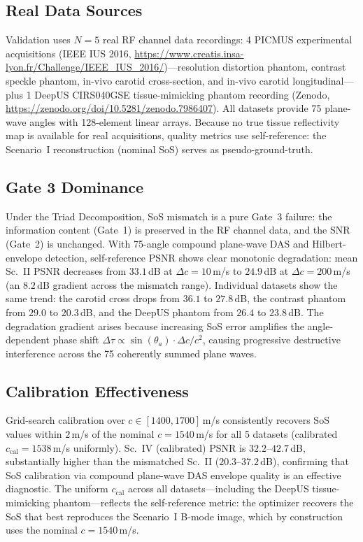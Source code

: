 \documentclass[11pt]{article}
\theoremstyle{definition}
\begin{document}
\subsection{Real Data Sources}
Validation uses $N{=}5$ real RF channel data recordings: 4 PICMUS experimental acquisitions (IEEE IUS 2016, \url{https://www.creatis.insa-lyon.fr/Challenge/IEEE_IUS_2016/})---resolution distortion phantom, contrast speckle phantom, in-vivo carotid cross-section, and in-vivo carotid longitudinal---plus 1 DeepUS CIRS040GSE tissue-mimicking phantom recording (Zenodo, \url{https://zenodo.org/doi/10.5281/zenodo.7986407}). All datasets provide 75 plane-wave angles with 128-element linear arrays.
Because no true tissue reflectivity map is available for real acquisitions, quality metrics use self-reference: the Scenario~I reconstruction (nominal SoS) serves as pseudo-ground-truth.

\subsection{Gate 3 Dominance}
Under the Triad Decomposition, SoS mismatch is a pure Gate~3 failure: the information content (Gate~1) is preserved in the RF channel data, and the SNR (Gate~2) is unchanged. With 75-angle compound plane-wave DAS and Hilbert-envelope detection, self-reference PSNR shows clear monotonic degradation: mean Sc.~II PSNR decreases from $33.1$\,dB at $\Delta c{=}10$\,m/s to $24.9$\,dB at $\Delta c{=}200$\,m/s (an $8.2$\,dB gradient across the mismatch range). Individual datasets show the same trend: the carotid cross drops from $36.1$ to $27.8$\,dB, the contrast phantom from $29.0$ to $20.3$\,dB, and the DeepUS phantom from $26.4$ to $23.8$\,dB. The degradation gradient arises because increasing SoS error amplifies the angle-dependent phase shift $\Delta\tau \propto \sin(\theta_a)\cdot\Delta c / c^2$, causing progressive destructive interference across the 75 coherently summed plane waves.

\subsection{Calibration Effectiveness}
Grid-search calibration over $c \in [1400, 1700]$\,m/s consistently recovers SoS values within $2$\,m/s of the nominal $c{=}1540$\,m/s for all 5 datasets (calibrated $c_{\mathrm{cal}} = 1538$\,m/s uniformly). Sc.~IV (calibrated) PSNR is $32.2$--$42.7$\,dB, substantially higher than the mismatched Sc.~II ($20.3$--$37.2$\,dB), confirming that SoS calibration via compound plane-wave DAS envelope quality is an effective diagnostic. The uniform $c_{\mathrm{cal}}$ across all datasets---including the DeepUS tissue-mimicking phantom---reflects the self-reference metric: the optimizer recovers the SoS that best reproduces the Scenario~I B-mode image, which by construction uses the nominal $c{=}1540$\,m/s.
\end{document}
